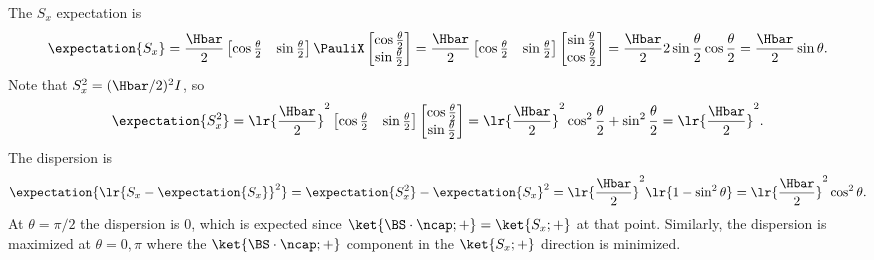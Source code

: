 {The \( S_x \) expectation is
%
\begin{dmath}\label{eqn:moreBraKetProblems:780}
\expectation{S_x}
=
\frac{\Hbar}{2}
\begin{bmatrix}
\cos\frac{\theta}{2} & \sin\frac{\theta}{2}
\end{bmatrix}
\PauliX
\begin{bmatrix}
\cos\frac{\theta}{2} \\
\sin\frac{\theta}{2}
\end{bmatrix}
=
\frac{\Hbar}{2}
\begin{bmatrix}
\cos\frac{\theta}{2} & \sin\frac{\theta}{2}
\end{bmatrix}
\begin{bmatrix}
\sin\frac{\theta}{2} \\
\cos\frac{\theta}{2}
\end{bmatrix}
=
\frac{\Hbar}{2} 2 \sin\frac{\theta}{2} \cos\frac{\theta}{2}
=
\frac{\Hbar}{2} \sin\theta.
\end{dmath}
%
Note that \( S_x^2 = (\Hbar/2)^2I \), so
%
\begin{dmath}\label{eqn:moreBraKetProblems:800}
\expectation{S_x^2}
=
\lr{\frac{\Hbar}{2}}^2
\begin{bmatrix}
\cos\frac{\theta}{2} & \sin\frac{\theta}{2}
\end{bmatrix}
\begin{bmatrix}
\cos\frac{\theta}{2} \\
\sin\frac{\theta}{2}
\end{bmatrix}
=
\lr{ \frac{\Hbar}{2} }^2
\cos^2\frac{\theta}{2} + \sin^2 \frac{\theta}{2}
=
\lr{ \frac{\Hbar}{2} }^2.
\end{dmath}
%
The dispersion is
%
\begin{dmath}\label{eqn:moreBraKetProblems:820}
\expectation{\lr{ S_x - \expectation{S_x}}^2}
=
\expectation{S_x^2} - \expectation{S_x}^2
=
\lr{ \frac{\Hbar}{2} }^2
\lr{1 - \sin^2 \theta}
=
\lr{ \frac{\Hbar}{2} }^2
\cos^2 \theta.
\end{dmath}
%
At \( \theta = \pi/2 \) the dispersion is 0, which is expected since \( \ket{\BS \cdot \ncap ; + } = \ket{ S_x ; + } \) at that point.  Similarly, the dispersion is maximized at \( \theta = 0,\pi \) where the \( \ket{\BS \cdot \ncap ; + } \) component in the \( \ket{S_x ; + } \) direction is minimized.

} %
